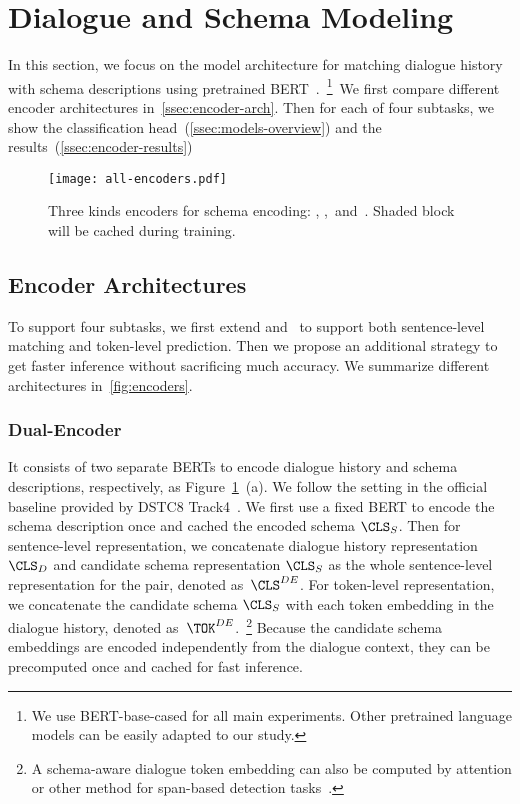 \section[Dialogue and Schema Modeling]{Dialogue and Schema Modeling}
\label{sec:sgd:models}
In this section, we focus on the model architecture for matching
dialogue history with schema descriptions using pretrained
BERT~\citep{devlin2019bert}.~\footnote{We use BERT-base-cased for all
  main experiments. Other pretrained language models can be easily
  adapted to our study.}~We first compare different encoder
architectures in~\autoref{ssec:encoder-arch}. Then for each of four
subtasks, we show the classification
head~(\autoref{ssec:models-overview}) and the results~(\autoref{ssec:encoder-results})

\begin{figure}[!t]
  \begin{center}
  \texttt{[image: all-encoders.pdf]}
  \end{center}
  \caption{\label{fig:encoders} Three kinds encoders for schema
    encoding: \DE, \CE,~and~\FE. Shaded
    block will be cached during training.}
\end{figure}

\subsection{Encoder Architectures}
\label{ssec:encoder-arch}
To support four subtasks, we first extend \DE and \CE~to support both
sentence-level matching and token-level prediction. Then we propose an
additional \FE strategy to get faster inference without sacrificing
much accuracy. We summarize different architectures
in~\autoref{fig:encoders}.

\subsubsection{Dual-Encoder}
\label{sssec:sgd:dual-encoder}

It consists of two separate BERTs to encode dialogue history and schema
descriptions, respectively, as Figure~\ref{fig:encoders}~(a). We follow
the setting in the official baseline provided by DSTC8
Track4~\citep{rastogi2020schema}. We first use a fixed BERT to encode
the schema description once and cached the encoded schema
$\CLS_{S}$. Then for sentence-level representation, we concatenate
dialogue history representation $\CLS_{D}$ and candidate schema
representation $\CLS_{S}$ as the whole sentence-level representation
for the pair, denoted as~${\CLS^{DE}}$.  For token-level
representation, we concatenate the candidate schema $\CLS_{S}$ with
each token embedding in the dialogue history, denoted
as~${\TOK^{DE}}$.~\footnote{A schema-aware dialogue token embedding can
  also be computed by attention or other method for span-based
  detection tasks~\citep{humeau2019poly, noroozi2020fast}.} Because the
candidate schema embeddings are encoded independently from the dialogue
context, they can be precomputed once and cached for fast inference.

